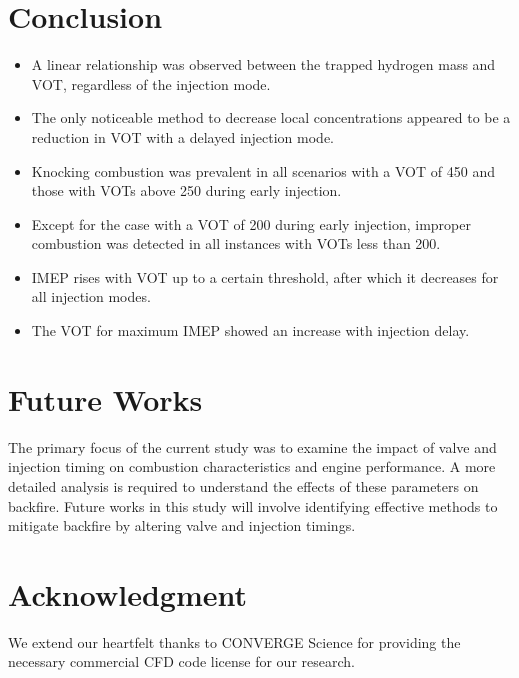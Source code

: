 \documentclass[conference]{IEEEtran}
\begin{document}
\section{Conclusion}
\begin{itemize}
    \item A linear relationship was observed between the trapped hydrogen mass and VOT, regardless of the injection mode.
    \item The only noticeable method to decrease local concentrations appeared to be a reduction in VOT with a delayed injection mode.
    \item Knocking combustion was prevalent in all scenarios with a VOT of 450 and those with VOTs above 250 during early injection.
    \item Except for the case with a VOT of 200 during early injection, improper combustion was detected in all instances with VOTs less than 200. 
    \item IMEP rises with VOT up to a certain threshold, after which it decreases for all injection modes.
    \item The VOT for maximum IMEP showed an increase with injection delay.
\end{itemize}


\section{Future Works}
The primary focus of the current study was to examine the impact of valve and injection timing on combustion characteristics and engine performance. A more detailed analysis is required to understand the effects of these parameters on backfire. Future works in this study will involve identifying effective methods to mitigate backfire by altering valve and injection timings.

\section*{Acknowledgment}
We extend our heartfelt thanks to CONVERGE Science for providing the necessary commercial CFD code license for our research.
\end{document}
